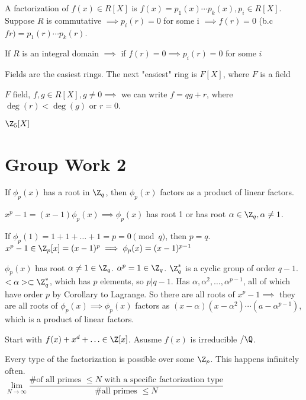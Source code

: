 \documentclass[10pt]{article}
\begin{document}
\begin{defn}
    A factorization of $f(x) \in R[X]$ is $f(x) = p_1(x) \cdots p_k(x), p_i \in R[X]$. Suppose $R$ is commutative $\implies p_i(r) = 0$ for some i $\implies f(r) = 0$ (b.c $fr) = p_1(r) \cdots p_k(r)$.

    If $R$ is an integral domain $\implies$ if $f(r) = 0 \implies p_i(r) = 0$ for some $i$
\end{defn}

\begin{rmk}
    Fields are the easiest rings. The next "easiest" ring is $F[X]$, where $F$ is a field
\end{rmk}

\begin{defn}
    $F$ field, $f, g\in R[X], g\neq 0 \implies$ we can write $f = qg + r$, where $\deg(r) < \deg(g)$ or $r = 0$.
\end{defn}

$\Z_5[X]$ 

\section{Group Work 2}
\begin{rmk}
    If $\phi_p(x)$ has a root in $\Z_q$, then $\phi_p(x)$ factors as a product of linear factors.
\end{rmk}

$x^p-1 = (x-1) \phi_p(x) \implies \phi_p(x)$ has root 1 or has root $\alpha \in \Z_q, \alpha\neq 1$.

If $\phi_p(1) = 1 + 1 + \ldots + 1 = p = 0 \pmod{q}$, then $p = q$. $x^p - 1 \in \Z_p[x] = (x-1)^p \implies \phi_p(x) = (x-1)^{p-1}$

$\phi_p(x)$ has root $\alpha \neq 1 \in \Z_q$. $\alpha^p = 1 \in \Z_q$. $\Z_q^*$ is a cyclic group of order $q-1$. $<\alpha> \subset \Z_q^*$, which has $p$ elements, so $p | q-1$. Has $\alpha, \alpha^2, \ldots, \alpha^{p-1}$, all of which have order $p$ by Corollary to Lagrange. So there are all roots of $x^p - 1 \implies$ they are all roots of $\phi_p(x) \implies \phi_p(x)$ factors as $(x-\alpha)(x-\alpha^2)\cdots (a-\alpha^{p-1})$, which is a product of linear factors.

Start with $f(x) + x^d + \ldots \in \Z[x]$. Asusme $f(x)$ is irreducible $/\Q$. 
\begin{thm*}
    Every type of the factorization is possible  over some $\Z_p$. This happens infinitely often.\\
    $\lim\limits_{N\to \infty}\dfrac{\text{\# of all primes }\leq N \text{ with a specific factorization type}}{\text{\# all primes }\leq N}$
\end{thm*}
\end{document}
